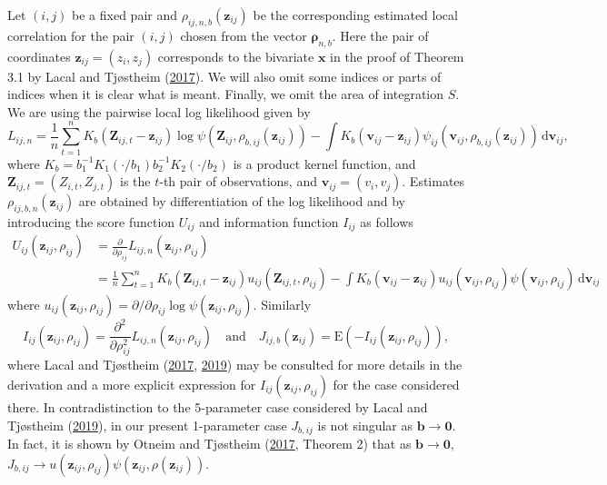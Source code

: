 \documentclass[
  12pt,
  letterpaper]{article}
\numberwithin{equation}{section}
\newcommand{\x}{\bm{x}}
\newcommand{\Z}{\bm{Z}}
\newcommand{\z}{\bm{z}}
\newcommand{\fv}{\bm{v}}
\newcommand{\frho}{\bm{\rho}}
\newcommand{\bb}{\bm{b}}
\newcommand{\E}{\textrm{E}}
\newcommand{\di}{\,\textrm{d}}
\begin{document}
Let \((i,j)\) be a fixed pair and \(\rho_{ij,n,b}(\z_{ij})\) be the corresponding estimated local correlation for the pair \((i,j)\) chosen from the vector \(\frho_{n,b}\). Here the pair of coordinates \(\z_{ij} = (z_i,z_j)\) corresponds to the bivariate \(\x\) in the proof of Theorem 3.1 by Lacal and Tjøstheim (\protect\hyperlink{ref-lacal2017local}{2017}). We will also omit some indices or parts of indices when it is clear what is meant. Finally, we omit the area of integration \(S\). We are using the pairwise local log likelihood given by
\[
L_{ij,n} = \frac{1}{n} \sum_{t=1}^{n} K_b(\Z_{ij,t}-\z_{ij}) \log \psi\left(\Z_{ij},\rho_{b,ij}(\z_{ij})\right) - \int K_b(\fv_{ij}-\z_{ij}) \psi_{ij}(\fv_{ij},\rho_{b,ij}(\z_{ij})) \di \fv_{ij},
\]
where \(K_b = b_1^{-1}K_1(\cdot/b_1) b_2^{-1} K_2(\cdot/b_2)\) is a product kernel function, and \(\Z_{ij,t} = (Z_{i,t},Z_{j,t})\) is the \(t\)-th pair of observations, and \(\fv_{ij} = (v_i,v_j)\). Estimates \(\rho_{ij,b,n}(\z_{ij})\) are obtained by differentiation of the log likelihood and by introducing the score function \(U_{ij}\) and information function \(I_{ij}\) as follows
\begin{align*}
U_{ij}(\z_{ij},\rho_{ij}) & = \frac{\partial}{\partial \rho_{ij}}L_{ij,n}(\z_{ij},\rho_{ij}) \\
& = \frac{1}{n}\sum_{t=1}^{n}K_b(\Z_{ij,t}-\z_{ij})u_{ij}(\Z_{ij,t},\rho_{ij}) - 
\int K_b(\fv_{ij}-\z_{ij})u_{ij}(\fv_{ij},\rho_{ij})\psi(\fv_{ij},\rho_{ij}) \di \fv_{ij}
\end{align*}
where \(u_{ij}(\z_{ij},\rho_{ij}) = \partial/\partial \rho_{ij} \log \psi(\z_{ij},\rho_{ij})\). Similarly
\[
I_{ij}(\z_{ij},\rho_{ij}) = \frac{\partial^2}{\partial \rho_{ij}^2} L_{ij,n}(\z_{ij}, \rho_{ij}) \quad \mbox{and} \quad J_{ij,b}(\z_{ij}) = \E(-I_{ij}(\z_{ij},\rho_{ij})),
\]
where Lacal and Tjøstheim (\protect\hyperlink{ref-lacal2017local}{2017}, \protect\hyperlink{ref-lacal2018estimating}{2019}) may be consulted for more details in the derivation and a more explicit expression for \(I_{ij}(\z_{ij},\rho_{ij})\) for the case considered there. In contradistinction to the 5-parameter case considered by Lacal and Tjøstheim (\protect\hyperlink{ref-lacal2018estimating}{2019}), in our present 1-parameter case \(J_{b,ij}\) is not singular as \(\bb \to \bm{0}\). In fact, it is shown by Otneim and Tjøstheim (\protect\hyperlink{ref-otneim2017locally}{2017}, Theorem 2) that as \(\bb \to \bm{0}\), \(J_{b,ij} \to u(\z_{ij},\rho_{ij})\psi(\z_{ij},\rho(\z_{ij}))\).
\end{document}
